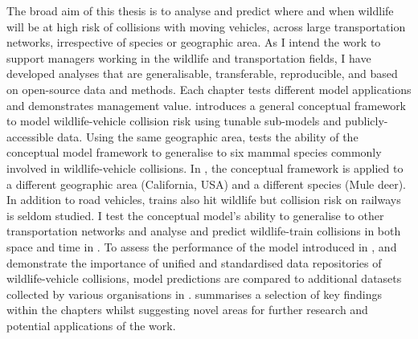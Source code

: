 The broad aim of this thesis is to analyse and predict where and when wildlife will be at high risk of collisions with moving vehicles, across large transportation networks, irrespective of species or geographic area. As I intend the work to support managers working in the wildlife and transportation fields, I have developed analyses that are generalisable, transferable, reproducible, and based on open-source data and methods. Each chapter tests different model applications and demonstrates management value.  introduces a general conceptual framework to model wildlife-vehicle collision risk using tunable sub-models and publicly-accessible data. Using the same geographic area,  tests the ability of the conceptual model framework to generalise to six mammal species commonly involved in wildlife-vehicle collisions. In , the conceptual framework is applied to a different geographic area (California, USA) and a different species (Mule deer). In addition to road vehicles, trains also hit wildlife but collision risk on railways is seldom studied. I test the conceptual model's ability to generalise to other transportation networks and analyse and predict wildlife-train collisions in both space and time in . To assess the performance of the model introduced in , and demonstrate the importance of unified and standardised data repositories of wildlife-vehicle collisions, model predictions are compared to additional datasets collected by various organisations in .  summarises a selection of key findings within the chapters whilst suggesting novel areas for further research and potential applications of the work.